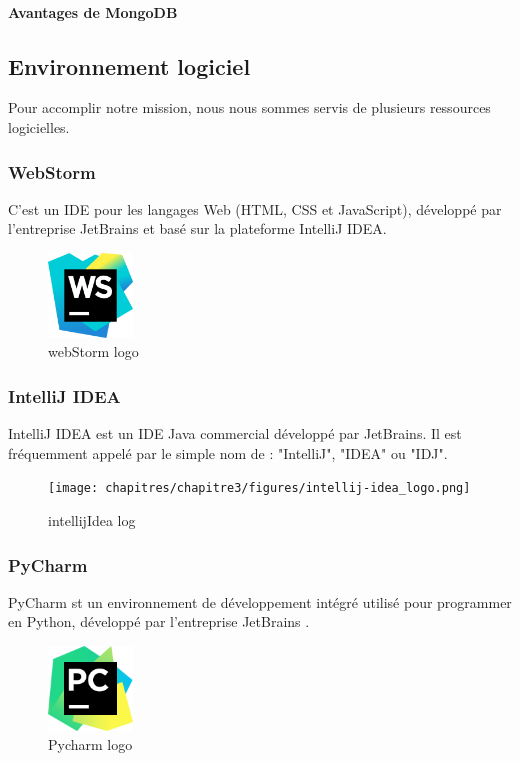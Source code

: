  \paragraph{Avantages de MongoDB}



\subsection{Environnement logiciel}
Pour accomplir notre mission, nous nous sommes servis de plusieurs ressources logicielles.
\subsubsection*{WebStorm}
C'est un IDE pour les langages Web (HTML, CSS et JavaScript), d\'evelopp\'e par l'entreprise JetBrains et bas\'e sur la plateforme IntelliJ IDEA.
\begin{figure}[!ht]\centering
\includegraphics[width=0.2\textwidth]{chapitres/chapitrex/figures/webstorm_logo.png}
\caption{webStorm logo}
\label{fig:webstorm_logo}
\end{figure}

\subsubsection*{IntelliJ IDEA}
IntelliJ IDEA est un IDE Java commercial d\'evelopp\'e par JetBrains. Il est fr\'equemment appel\'e par le simple nom de : "IntelliJ", "IDEA" ou "IDJ".
\begin{figure}[!ht]\centering
\texttt{[image: chapitres/chapitre3/figures/intellij-idea\_logo.png]}
\caption{intellijIdea log}
\label{fig:intellij-idea_log}
\end{figure}
\subsubsection*{PyCharm }
PyCharm  st un environnement de développement intégré utilisé pour programmer en Python,  d\'evelopp\'e par l'entreprise JetBrains .
\begin{figure}[!ht]\centering
\includegraphics[width=0.2\textwidth]{chapitres/chapitrex/figures/pycharme.png}
\caption{Pycharm logo}
\label{fig:pycharme}
\end{figure}
